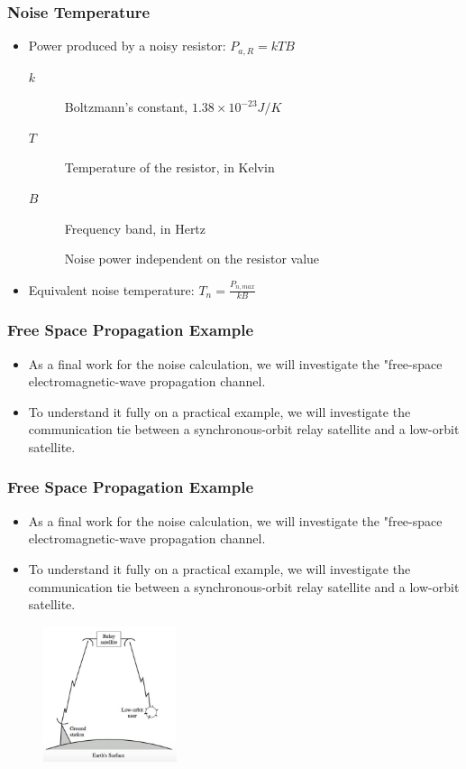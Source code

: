 \documentclass{beamer}
\begin{document}
\begin{frame}
	\frametitle{Noise Temperature}
	\begin{itemize}
		\item Power produced by a noisy resistor: $ P_{a,R} = kTB $
		\begin{description}
			\item[$k$] Boltzmann's constant, $ 1.38 \times 10^{-23} J/K $
			\item[$T$] Temperature of the resistor, in Kelvin
			\item[$B$] Frequency band, in Hertz
			\item[] Noise power independent on the resistor value
		\end{description}
		\item Equivalent noise temperature: $ T_n = \frac{P_{n,max}}{kB} $
	\end{itemize}
\end{frame}


\begin{frame}
	\frametitle{Free Space Propagation Example}
	\begin{itemize}
		\item As a final work for the noise calculation, we will investigate the "free-space electromagnetic-wave propagation channel.
		\item To understand it fully on a practical example, we will investigate the communication tie between a synchronous-orbit relay satellite and a low-orbit satellite.
	\end{itemize}
\end{frame}


\begin{frame}
	\frametitle{Free Space Propagation Example}
	\begin{itemize}
		\item As a final work for the noise calculation, we will investigate the "free-space electromagnetic-wave propagation channel.
		\item To understand it fully on a practical example, we will investigate the communication tie between a synchronous-orbit relay satellite and a low-orbit satellite.
	\end{itemize}
	\begin{figure}
		\includegraphics[width=0.35\textwidth]{orbit.png}
	\end{figure}
\end{frame}
\end{document}
